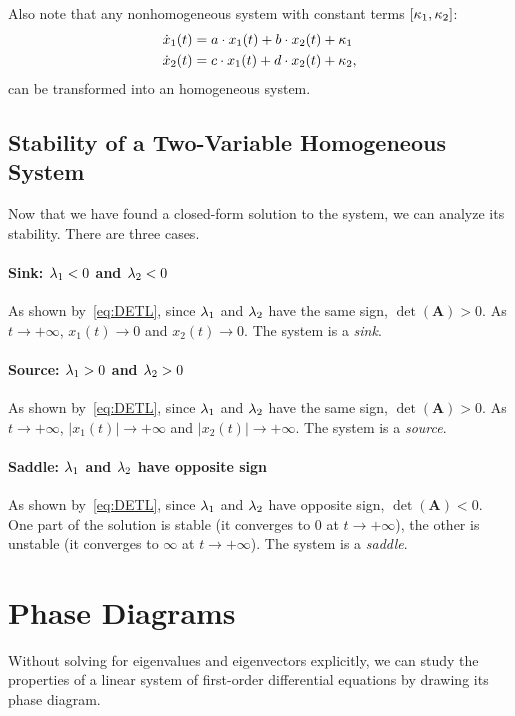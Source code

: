 \documentclass[letterpaper,12pt,leqno]{article}
\begin{document}
Also note that any nonhomogeneous system with constant terms $\left[ \kappa_{1},\kappa_{2} \right]$:
\begin{align*}
\dot{x}_{1}(t) &=a\cdot x_{1}(t)+b\cdot x_{2}(t)+\kappa_{1} \\
\dot{x}_{2}(t) &=c\cdot x_{1}(t)+d\cdot x_{2}(t)+\kappa_{2},
\end{align*}
can be transformed into an homogeneous system.

\subsection{Stability of a Two-Variable Homogeneous System}

Now that we have found a closed-form solution to the system, we can analyze its stability. There are three cases.

\paragraph{Sink: $\lambda_{1}<0$ and $\lambda_{2}<0$} As shown by~\eqref{eq:DETL}, since $\lambda_{1}$ and $\lambda_{2}$ have the same sign, $\det(\bm{A}) >0$. As $t\to +\infty$, $x_{1}(t)\to 0$ and $x_{2}(t)\to 0$. The system is a \textit{sink}.

\paragraph{Source: $\lambda_{1}>0$ and $\lambda_{2}>0$} As shown by~\eqref{eq:DETL}, since $\lambda_{1}$ and $\lambda_{2}$ have the same sign, $\det(\bm{A}) >0$. As $t\to +\infty$, $|x_{1}(t)|\to +\infty$ and $|x_{2}(t)|\to +\infty$. The system is a \textit{source}.

\paragraph{Saddle: $\lambda_{1}$ and $\lambda_{2}$ have opposite sign} As shown by~\eqref{eq:DETL}, since $\lambda_{1}$ and $\lambda_{2}$ have opposite sign, $\det(\bm{A}) <0$. One part of the solution is stable (it converges to 0 at $t\to +\infty$), the other is unstable (it converges to $\infty$ at $t\to +\infty$). The system is a \textit{saddle}.


\section{Phase Diagrams}\label{sec:three}

Without solving for eigenvalues and eigenvectors explicitly, we can study the properties of a linear system of first-order differential equations by drawing its phase diagram. 
\end{document}
